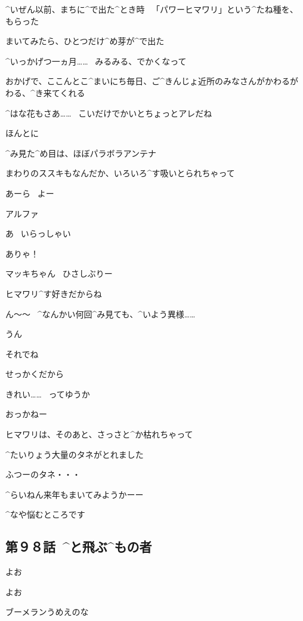 \page[129]
\Alpha ^{いぜん}{以前}、まちに^{で}{出}た^{とき}{時}
\ 「パワーヒマワリ」という^{たね}{種}を、もらった

\Alpha まいてみたら、ひとつだけ^{め}{芽}が^{で}{出}た

\Alpha ^{いっかげつ}{一ヵ月}……
\ みるみる、でかくなって

\page[130]
\Alpha おかげで、ここんとこ^{まいにち}{毎日}、ご^{きんじょ}{近所}のみなさんがかわるがわる、^{き}{来}てくれる

\Person ^{はな}{花}もさあ……
\ こいだけでかいとちょっとアレだね

\Alpha ほんとに

\page[131]
\Alpha ^{み}{見}た^{め}{目}は、ほぼパラボラアンテナ

\Alpha まわりのススキもなんだか、いろいろ^{す}{吸}いとられちゃって

\Person あーら
\ よー

\page[132]
\Takahiro アルファ

\Alpha あ
\ いらっしゃい

\Alpha ありゃ！

\Alpha マッキちゃん
\ ひさしぶりー

\Makki ヒマワリ^{す}{好}きだからね

\page[133]
\Takahiro ん〜〜
\ ^{なんかい}{何回}^{み}{見}ても、^{いよう}{異様}……

\Alpha うん

\Takahiro それでね

\Takahiro せっかくだから

\page[135]
\Alpha きれい……
\ ってゆうか

 おっかねー

\page[136]
\Alpha ヒマワリは、そのあと、さっさと^{か}{枯}れちゃって

\Alpha ^{たいりょう}{大量}のタネがとれました

\Alpha ふつーのタネ・・・

\Alpha ^{らいねん}{来年}もまいてみようかーー

\Alpha ^{なや}{悩}むところです


\subsection{第９８話\ ^{と}{飛}ぶ^{もの}{者}}

\page[140]
\Ayase よお

\Makki よお

\page[141]
\Ayase ブーメランうめえのな


